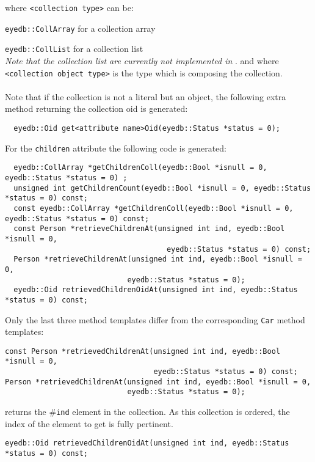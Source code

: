 \normalsize
where \texttt{<collection type>} can be:
\be
\item \texttt{eyedb::CollArray} for a collection array
\item \texttt{eyedb::CollList} for a collection list\\
\emph{Note that the collection list are currently not implemented in
\eyedb}.
\ee
and where \texttt{<collection object type>} is the type which is composing
the collection.
\\
\\
Note that if the collection is not a literal but an object, the following
extra method returning the collection oid is generated:
\verbsize
\begin{verbatim}
  eyedb::Oid get<attribute name>Oid(eyedb::Status *status = 0);
\end{verbatim}
\normalsize
For the \texttt{children} attribute the following code is generated:
\verbsize
\begin{verbatim}
  eyedb::CollArray *getChildrenColl(eyedb::Bool *isnull = 0, eyedb::Status *status = 0) ;
  unsigned int getChildrenCount(eyedb::Bool *isnull = 0, eyedb::Status *status = 0) const;
  const eyedb::CollArray *getChildrenColl(eyedb::Bool *isnull = 0, eyedb::Status *status = 0) const;
  const Person *retrieveChildrenAt(unsigned int ind, eyedb::Bool *isnull = 0,
                                     eyedb::Status *status = 0) const;
  Person *retrieveChildrenAt(unsigned int ind, eyedb::Bool *isnull = 0,
                            eyedb::Status *status = 0);
  eyedb::Oid retrievedChildrenOidAt(unsigned int ind, eyedb::Status *status = 0) const;
\end{verbatim}
\normalsize
Only the last three method templates differ from the corresponding
\texttt{Car} method templates:
\be
\item
\verbsize
\begin{verbatim}
const Person *retrievedChildrenAt(unsigned int ind, eyedb::Bool *isnull = 0,
                                  eyedb::Status *status = 0) const;
Person *retrievedChildrenAt(unsigned int ind, eyedb::Bool *isnull = 0,
                            eyedb::Status *status = 0);
\end{verbatim}
\normalsize
returns the \#\texttt{ind} element in the collection.
As this collection is ordered, the index of the element to get is fully
pertinent.
\item
\verbsize
\begin{verbatim}
eyedb::Oid retrievedChildrenOidAt(unsigned int ind, eyedb::Status *status = 0) const;
\end{verbatim}
